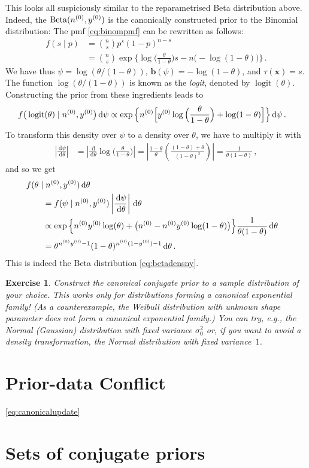 \documentclass[12pt,a4paper	,twoside]{article}
\newcommand{\dd}{\,\mathrm{d}}
\newcommand{\mbf}[1]{\mathbf{#1}}
\newcommand{\bs}[1]{\boldsymbol{#1}}
\renewcommand{\vec}[1]{{\bs#1}}
\newcommand{\be}{\operatorname{Beta}}
\newcommand{\logit}{\operatorname{logit}} %
\newtheorem{myex}{Exercise}
\begin{document}
This looks all suspiciously similar to the reparametrised Beta distribution above.
Indeed, the $\be(\nz,\yz)$ is the canonically constructed prior to the Binomial distribution:
The pmf \eqref{eq:binompmf} can be rewritten as follows:
\begin{align}
f(s\mid p)
 &= {n \choose s} p^s (1-p)^{n-s} \\
 &= {n \choose s} \exp\Big\{ \log\Big(\frac{\theta}{1-\theta}\Big) s - n \big(-\log(1-\theta)\big) \Big\} \,.
\end{align}
We have thus $\psi = \log(\theta/(1-\theta))$, $\mbf{b}(\psi) = -\log(1-\theta)$, and $\tau(\vec{x}) = s$.
The function $\log(\theta/(1-\theta))$ is known as the \emph{logit}, denoted by $\logit(\theta)$.
Constructing the prior from these ingredients leads to
\begin{align}
f\big(\logit(\theta) \mid \nz, \yz\big) \dd\psi %
 &\propto \exp\Big\{ \nz \Big[ \yz \log\Big(\frac{\theta}{1-\theta}\Big) + \log(1-\theta) \Big] \Big\} \dd\psi\,.
\end{align}
To transform this density over $\psi$ to a density over $\theta$,
we have to multiply it with
\begin{align}
\left|\frac{\dd\psi}{\dd\theta}\right|
 &= \left|\frac{\dd}{\dd\theta} \log\Big(\frac{\theta}{1-\theta}\Big)\right|
  = \left| \frac{1-\theta}{\theta}\left(\frac{(1-\theta)+\theta}{(1-\theta)^2}\right) \right|
  = \frac{1}{\theta(1-\theta)}\,,
\end{align}
and so we get
\begin{align}
\lefteqn{f(\theta\mid \nz, \yz)\dd\theta} \qquad \\  
 &= f(\psi\mid \nz, \yz) \left|\frac{\dd\psi}{\dd\theta}\right| \dd\theta\\
 &\propto \exp\Big\{ \nz\yz\log(\theta) + \big(\nz - \nz\yz\log(1-\theta)\big)\Big\} \frac{1}{\theta(1-\theta)}\dd\theta\\
 &= \theta^{\nz\yz - 1} (1-\theta)^{\nz(1-\yz) - 1} \dd\theta\,.
\end{align}
This is indeed the Beta distribution \eqref{eq:betadensny}.%

\begin{myex}
Construct the canonical conjugate prior to a sample distribution of your choice.
This works only for distributions forming a canonical exponential family!
(As a counterexample, the Weibull distribution with unknown shape parameter does not form a canonical exponential family.)
You can try, e.g., the Normal (Gaussian) distribution with fixed variance $\sigma^2_0$
or, if you want to avoid a density transformation, the Normal distribution with fixed variance~$1$.
\end{myex}


\section{Prior-data Conflict}

\eqref{eq:canonicalupdate}

\section{Sets of conjugate priors}
\end{document}
